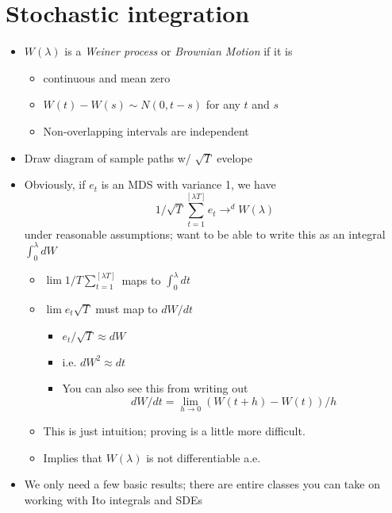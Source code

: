 
\chapter{Stochastic integration}

\begin{itemize}
\item
  $W(λ)$ is a \emph{Weiner process} or \emph{Brownian Motion} if it is
  \begin{itemize}
  \item continuous and mean zero
  \item $W(t) - W(s) \sim N(0, t-s)$ for any $t$ and $s$
  \item Non-overlapping intervals are independent
  \end{itemize}
\item Draw diagram of sample paths w/ $\sqrt T$ evelope
\item Obviously, if $e_t$ is an MDS with variance 1, we have
  \[1/\sqrt{T} \sum_{t=1}^{[λT]} e_t →^d W(λ)\]
  under reasonable assumptions; want to be able to write this as an
  integral $\int_0^λ dW$

  \begin{itemize}
  \item
    $\lim 1/T \sum_{t=1}^{[λT]}$ maps to $\int_0^λ dt$
  \item
    $\lim e_t \sqrt{T}$ must map to $dW/dt$

    \begin{itemize}
    \item $e_t/\sqrt{T} ≈ dW$
    \item i.e. $dW^2 ≈ dt$
    \item You can also see this from writing out
      \[dW/dt = \lim_{h → 0} (W(t+h) - W(t)) / h\]
    \end{itemize}
  \item This is just intuition; proving is a little more difficult.
  \item Implies that $W(λ)$ is not differentiable a.e.
  \end{itemize}
\item We only need a few basic results; there are entire classes you
  can take on working with Ito integrals and SDEs
\end{itemize}

